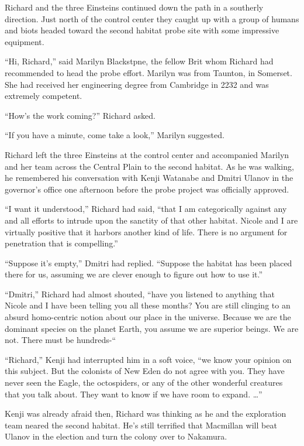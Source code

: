 \documentclass[]{article}
\begin{document}
{Richard and the three Einsteins continued down the path in a southerly direction.  Just north of the control center they caught up with a group of humans and biots headed toward the second habitat probe site with some impressive equipment.

“Hi, Richard,” said Marilyn Blackstpne, the fellow Brit whom Richard had recommended to head the probe effort.  Marilyn was from Taunton, in Somerset.  She had received her engineering degree from Cambridge in 2232 and was extremely competent.

“How’s the work coming?” Richard asked.

“If you have a minute, come take a look,” Marilyn suggested.

Richard left the three Einsteins at the control center and accompanied Marilyn and her team across the Central Plain to the second habitat.  As he was walking, he remembered his conversation with Kenji Watanabe and Dmitri Ulanov in the governor’s office one afternoon before the probe project was officially approved.

“I want it understood,” Richard had said, “that I am categorically against any and all efforts to intrude upon the sanctity of that other habitat.  Nicole and I are virtually positive that it harbors another kind of life.  There is no argument for penetration that is compelling.”

“Suppose it’s empty,” Dmitri had replied.  “Suppose the habitat has been placed there for us, assuming we are clever enough to figure out how to use it.”

“Dmitri,” Richard had almost shouted, “have you listened to anything that Nicole and I have been telling you all these months? You are still clinging to an absurd homo-centric notion about our place in the universe.  Because we are the dominant species on the planet Earth, you assume we are superior beings.  We are not.  There must be hundreds-“

“Richard,” Kenji had interrupted him in a soft voice, “we know your opinion on this subject.  But the colonists of New Eden do not agree with you.  They have never seen the Eagle, the octospiders, or any of the other wonderful creatures that you talk about.  They want to know if we have room to expand.  …”

Kenji was already afraid then, Richard was thinking as he and the exploration team neared the second habitat.  He’s still terrified that Macmillan will beat Ulanov in the election and turn the colony over to Nakamura.

}
\end{document}
